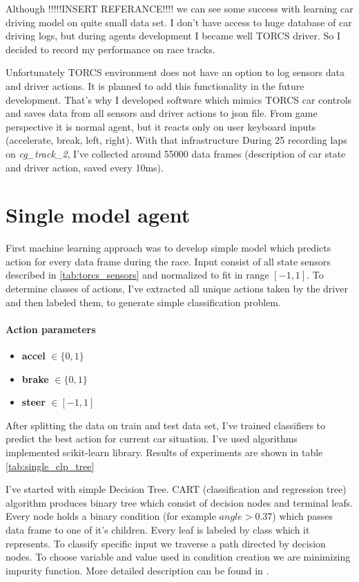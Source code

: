 \documentclass[declaration,shortabstract,english,inz]{iithesis}
\begin{document}
Although  !!!!!INSERT REFERANCE!!!! we can see some success with learning car driving model on quite small data set. I don't have access to huge database of car driving logs, but during agents development I became well TORCS driver. So I decided to record my performance on race tracks.

Unfortunately TORCS environment does not have an option to log sensors data and driver actions. It is planned to add this functionality in the future development. That's why I developed software which mimics TORCS car controls and saves data from all sensors and driver actions to json file. From game perspective it is normal agent, but it reacts only on user keyboard inputs (accelerate, break, left, right).  With that infrastructure During 25 recording laps on \textit{cg\_track\_2}, I've collected around 55000 data frames (description of car state and driver action, saved every 10ms).

\section{Single model agent}



First machine learning approach was to develop simple model which predicts action for every data frame during the race. Input consist of all state sensors described  in \ref{tab:torcs_sensors} and normalized to fit in range $[-1,1]$. To determine classes of actions, I've extracted all unique actions taken by the driver and then labeled them, to generate simple classification problem.
\paragraph{Action parameters}
\begin{itemize}
    \item \textbf{accel} $\in \{0,1\}$
    \item \textbf{brake} $\in \{0,1\}$ 
    \item \textbf{steer} $\in [-1,1]$
\end{itemize}
After splitting the data on train and test data set, I've trained classifiers to predict the best action for current car situation. I've used algorithms implemented scikit-learn \cite{scikit_learn} library. Results of experiments are shown in table \ref{tab:single_clp_tree}


I've started with simple Decision Tree. CART (classification and regression tree) algorithm produces binary tree which consist of decision nodes and terminal leafs. Every node holds a binary condition (for example $\textit{angle} > 0.37$) which passes data frame to one of it's children. Every leaf is labeled by class which it represents. To classify specific input we traverse a path directed by decision nodes. To choose variable and value used in condition creation we are minimizing impurity function. More detailed description can be found in \cite{Introduction_ML}.
\end{document}
